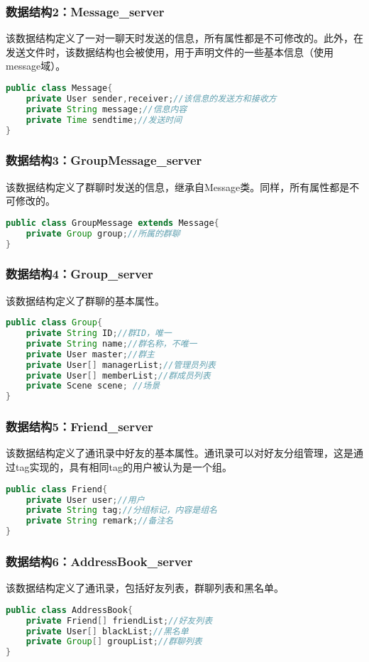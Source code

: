 \subsubsection{数据结构2：Message\_server}
该数据结构定义了一对一聊天时发送的信息，所有属性都是不可修改的。此外，在发送文件时，该数据结构也会被使用，用于声明文件的一些基本信息（使用message域）。
\begin{lstlisting}[language=Java, caption=Message定义]
public class Message{
    private User sender,receiver;//该信息的发送方和接收方
    private String message;//信息内容
    private Time sendtime;//发送时间
}
\end{lstlisting}

\subsubsection{数据结构3：GroupMessage\_server}
该数据结构定义了群聊时发送的信息，继承自Message类。同样，所有属性都是不可修改的。
\begin{lstlisting}[language=Java, caption=GroupMessage定义]
public class GroupMessage extends Message{
    private Group group;//所属的群聊
}
\end{lstlisting}

\subsubsection{数据结构4：Group\_server}
该数据结构定义了群聊的基本属性。
\begin{lstlisting}[language=Java, caption=Group定义]
public class Group{
    private String ID;//群ID，唯一
    private String name;//群名称，不唯一
    private User master;//群主
    private User[] managerList;//管理员列表
    private User[] memberList;//群成员列表
    private Scene scene; //场景
}
\end{lstlisting}


\subsubsection{数据结构5：Friend\_server}
该数据结构定义了通讯录中好友的基本属性。通讯录可以对好友分组管理，这是通过tag实现的，具有相同tag的用户被认为是一个组。
\begin{lstlisting}[language=Java, caption=Friend定义]
public class Friend{
    private User user;//用户
    private String tag;//分组标记，内容是组名
    private String remark;//备注名
}
\end{lstlisting}


\subsubsection{数据结构6：AddressBook\_server}
该数据结构定义了通讯录，包括好友列表，群聊列表和黑名单。
\begin{lstlisting}[language=Java, caption=AddressBook定义]
public class AddressBook{
    private Friend[] friendList;//好友列表
    private User[] blackList;//黑名单
    private Group[] groupList;//群聊列表
}
\end{lstlisting}


